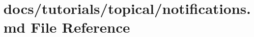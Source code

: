 \hypertarget{notifications_8md}{}\section{docs/tutorials/topical/notifications.md File Reference}
\label{notifications_8md}
